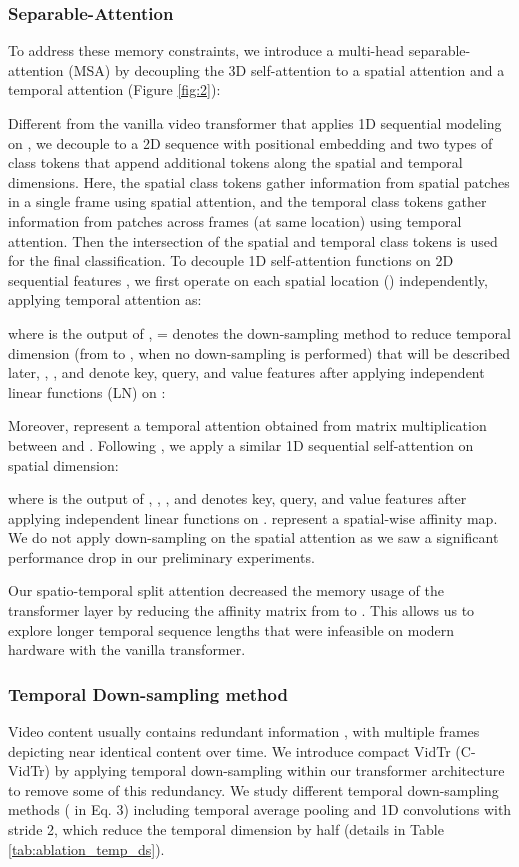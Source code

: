 \documentclass[10pt,twocolumn,letterpaper]{article}
\begin{document}
\subsubsection{Separable-Attention}
To address these memory constraints, we introduce a multi-head separable-attention (MSA) by decoupling the 3D self-attention to a spatial attention  and a temporal attention  (Figure \ref{fig:2}): 


Different from the vanilla video transformer that applies 1D sequential modeling on , we decouple  to a 2D sequence  with positional embedding and two types of class tokens that append additional tokens along the spatial and temporal dimensions. 
Here, the spatial class tokens gather information from spatial patches in a single frame using spatial attention, and the temporal class tokens gather information from patches across frames (at same location) using temporal attention. Then the intersection of the spatial and temporal class tokens  is used for the final classification. 
To decouple 1D self-attention functions on 2D sequential features , we first operate on each spatial location () independently, applying temporal attention as:

where  is the output of ,  =
 denotes the down-sampling method to reduce temporal dimension (from  to ,  when no down-sampling is performed) that will be described later, , , and  denote key, query, and value features after applying independent linear functions (LN) on :

Moreover,  represent a temporal attention obtained from matrix multiplication between  and . 
Following , we apply a similar 1D sequential self-attention  on spatial dimension: 

where  is the output of , , , and  denotes key, query, and value features after applying independent linear functions on .  represent a spatial-wise affinity map. We do not apply down-sampling on the spatial attention as we saw a significant performance drop in our preliminary experiments.

Our spatio-temporal split attention decreased the memory usage of the transformer layer by reducing the affinity matrix from  to . This allows us to explore longer temporal sequence lengths that were infeasible on modern hardware with the vanilla transformer.

\subsubsection{Temporal Down-sampling method}
\label{sec:c_vidtr}
Video content usually contains redundant information \cite{li2020nuta}, with multiple frames depicting near identical content over time. We introduce compact VidTr (C-VidTr) by applying temporal down-sampling within our transformer architecture to remove some of this redundancy. 
We study different temporal down-sampling methods ( in Eq. 3) including temporal average pooling and 1D convolutions with stride 2, which reduce the temporal dimension by half (details in Table \ref{tab:ablation_temp_ds}).  
\end{document}
